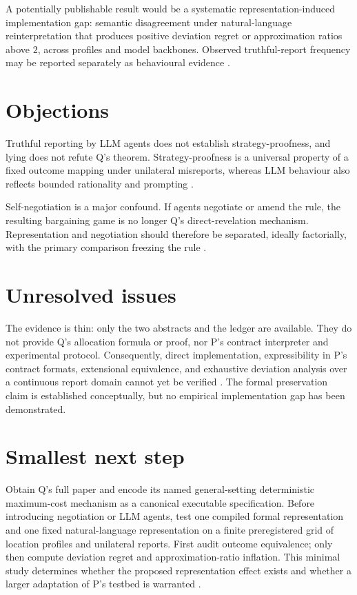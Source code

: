 \documentclass{article}
\begin{document}
A potentially publishable result would be a systematic representation-induced implementation gap: semantic disagreement under natural-language reinterpretation that produces positive deviation regret or approximation ratios above \(2\), across profiles and model backbones. Observed truthful-report frequency may be reported separately as behavioural evidence .

\section{Objections}

Truthful reporting by LLM agents does not establish strategy-proofness, and lying does not refute Q's theorem. Strategy-proofness is a universal property of a fixed outcome mapping under unilateral misreports, whereas LLM behaviour also reflects bounded rationality and prompting .

Self-negotiation is a major confound. If agents negotiate or amend the rule, the resulting bargaining game is no longer Q's direct-revelation mechanism. Representation and negotiation should therefore be separated, ideally factorially, with the primary comparison freezing the rule .

\section{Unresolved issues}

The evidence is thin: only the two abstracts and the ledger are available. They do not provide Q's allocation formula or proof, nor P's contract interpreter and experimental protocol. Consequently, direct implementation, expressibility in P's contract formats, extensional equivalence, and exhaustive deviation analysis over a continuous report domain cannot yet be verified . The formal preservation claim is established conceptually, but no empirical implementation gap has been demonstrated.

\section{Smallest next step}

Obtain Q's full paper and encode its named general-setting deterministic maximum-cost mechanism as a canonical executable specification. Before introducing negotiation or LLM agents, test one compiled formal representation and one fixed natural-language representation on a finite preregistered grid of location profiles and unilateral reports. First audit outcome equivalence; only then compute deviation regret and approximation-ratio inflation. This minimal study determines whether the proposed representation effect exists and whether a larger adaptation of P's testbed is warranted .
\end{document}
